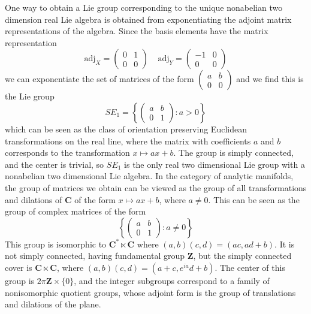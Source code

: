 One way to obtain a Lie group corresponding to the unique nonabelian two dimension real Lie algebra is obtained from exponentiating the adjoint matrix representations of the algebra. Since the basis elements have the matrix representation
%
\[ \text{adj}_X = \begin{pmatrix} 0 & 1 \\ 0 & 0 \end{pmatrix}\ \ \ \ \ \text{adj}_Y = \begin{pmatrix} -1 & 0 \\ 0 & 0 \end{pmatrix} \]
%
we can exponentiate the set of matrices of the form $\left( \begin{smallmatrix} a & b \\ 0 & 0 \end{smallmatrix} \right)$ and we find this is the Lie group
%
\[ SE_1 = \left\{ \begin{pmatrix} a & b \\ 0 & 1 \end{pmatrix} : a > 0 \right\} \]
%
which can be seen as the class of orientation preserving Euclidean transformations on the real line, where the matrix with coefficients $a$ and $b$ corresponds to the transformation $x \mapsto ax + b$. The group is simply connected, and the center is trivial, so $SE_1$ is the only real two dimensional Lie group with a nonabelian two dimensional Lie algebra. In the category of analytic manifolds, the group of matrices we obtain can be viewed as the group of all transformations and dilations of $\mathbf{C}$ of the form $x \mapsto ax + b$, where $a \neq 0$. This can be seen as the group of complex matrices of the form
%
\[ \left\{ \begin{pmatrix} a & b \\ 0 & 1 \end{pmatrix} : a \neq 0 \right\} \]
%
This group is isomorphic to $\mathbf{C}^* \ltimes \mathbf{C}$ where $(a,b)(c,d) = (ac, ad + b)$. It is not simply connected, having fundamental group $\mathbf{Z}$, but the simply connected cover is $\mathbf{C} \ltimes \mathbf{C}$, where $(a,b)(c,d) = (a + c, e^{ia}d + b)$. The center of this group is $2 \pi \mathbf{Z} \times \{ 0 \}$, and the integer subgroups correspond to a family of nonisomorphic quotient groups, whose adjoint form is the group of translations and dilations of the plane.


